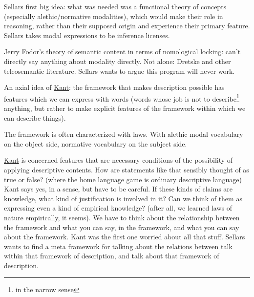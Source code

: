Sellars first big idea: what was needed was a functional theory of concepts (especially alethic/normative modalities), which would make their role in reasoning, rather than their supposed origin and experience their primary feature. Sellars takes modal expressions to be inference licenses.


Jerry Fodor's theory of semantic content in terms of nomological locking: can't directly say anything about modality directly. Not alone: Dretske and other teleosemantic literature. Sellars wants to argue this program will never work.

An axial idea of \href{doc/phil/People/Kant|An axial idea of Kant}{Kant}: the framework that makes description possible has features which we can express with words (words whose job is not to describe\footnote{in the narrow sense} anything, but rather to make explicit features of the framework within which we can describe things).

The framework is often characterized with laws. With alethic modal vocabulary on the object side, normative vocabulary on the subject side.

\href{doc/phil/People/Kant|What Kant is concerned with}{Kant} is concerned features that are necessary conditions of the possibility of applying descriptive contents. How are statements like that sensibly thought of as true or false? (where the home language game is ordinary descriptive language) Kant says yes, in a sense, but have to be careful. If these kinds of claims are knowledge, what kind of justification is involved in it? Can we think of them as expressing even a kind of empirical knowledge? (after all, we learned laws of nature empirically, it seems). We have to think about the relationship between the framework and what you can say, in the framework, and what you can say about the framework. Kant was the first one worried about all that stuff. Sellars wants to find a meta framework for talking about the relations between talk within that framework of description, and talk about that framework of description.

